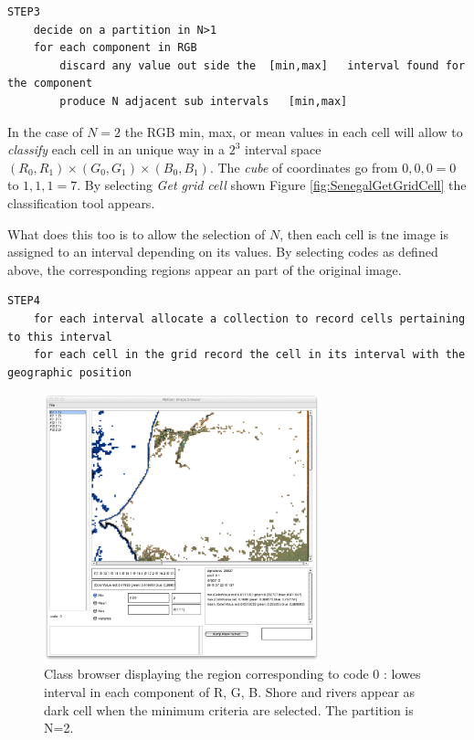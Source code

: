 \begin{lstlisting}  
STEP3
	decide on a partition in N>1
	for each component in RGB
		discard any value out side the  [min,max]   interval found for the component
		produce N adjacent sub intervals   [min,max]  
\end{lstlisting}

In the case of $N=2$ the RGB min, max, or mean values in each cell will allow to {\sl classify}
each cell in an unique way in a $2^3$ interval space $(R_0,R_1) \times (G_0,G_1) \times (B_0,B_1) $.
The {\sl cube} of coordinates go from $0,0,0= 0$ to $1,1,1= 7$.
By selecting {\sl Get grid cell} shown Figure \ref{fig:SenegalGetGridCell} the classification tool appears.

What does this too is to allow the selection of $N$, then each cell is tne image is assigned to an interval
depending on its values. By selecting codes as defined above, the corresponding regions appear
an part of the original image. 


\begin{lstlisting}  
STEP4
	for each interval allocate a collection to record cells pertaining to this interval
	for each cell in the grid record the cell in its interval with the geographic position
\end{lstlisting}


\begin{figure}[hbtp]
\begin{center} 
\includegraphics[width=8cm]{Senegal5x5code0.png}
\caption{Class browser displaying the region corresponding to code 0 : lowes interval in each component of R, G, B.
Shore and rivers appear as dark cell when the minimum criteria are selected. The partition is N=2.}
\label{fig:Senegal5x5code0}
\end{center}
\end{figure}